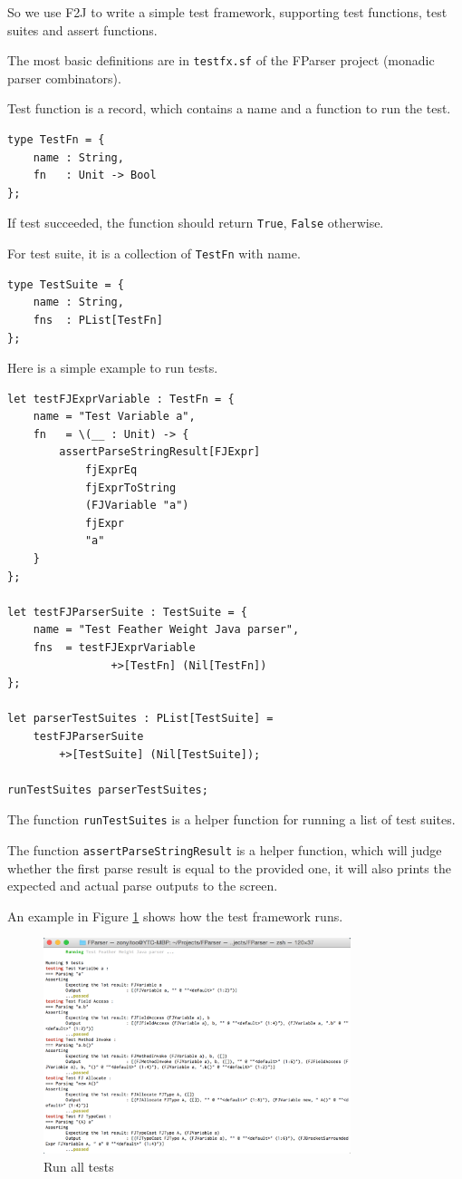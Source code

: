 So we use F2J to write a simple test framework, supporting test functions, test suites and assert functions.

The most basic definitions are in \texttt{testfx.sf} of the FParser project (monadic parser combinators).

Test function is a record, which contains a name and a function to run the test.

\begin{lstlisting}
type TestFn = {
    name : String,
    fn   : Unit -> Bool
};
\end{lstlisting}

If test succeeded, the function should return \texttt{True}, \texttt{False} otherwise.

For test suite, it is a collection of \texttt{TestFn} with name.

\begin{lstlisting}
type TestSuite = {
    name : String,
    fns  : PList[TestFn]
};
\end{lstlisting}

Here is a simple example to run tests.

\begin{lstlisting}
let testFJExprVariable : TestFn = {
    name = "Test Variable a",
    fn   = \(__ : Unit) -> {
        assertParseStringResult[FJExpr]
            fjExprEq
            fjExprToString
            (FJVariable "a")
            fjExpr
            "a"
    }
};

let testFJParserSuite : TestSuite = {
    name = "Test Feather Weight Java parser",
    fns  = testFJExprVariable
                +>[TestFn] (Nil[TestFn])
};

let parserTestSuites : PList[TestSuite] =
    testFJParserSuite
        +>[TestSuite] (Nil[TestSuite]);

runTestSuites parserTestSuites;
\end{lstlisting}

The function \texttt{runTestSuites} is a helper function for running a list of test suites.

The function \texttt{assertParseStringResult} is a helper function, which will judge whether the first parse result is equal to the provided one, it will also prints the expected and actual parse outputs to the screen.

An example in Figure \ref{fig:monadic_runalltests} shows how the test framework runs.

\begin{figure}[h!]
    \centering
    \includegraphics[width=0.8\textwidth]{imgs/Monadic_RunAllTests}
    \caption{Run all tests}
    \label{fig:monadic_runalltests}
\end{figure}
